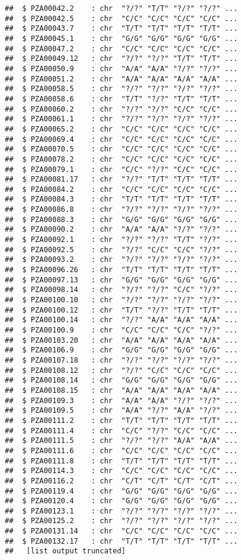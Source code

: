 \documentclass[
]{article}
\begin{document}
\begin{verbatim}
##  $ PZA00042.2    : chr  "?/?" "T/T" "?/?" "?/?" ...
##  $ PZA00042.5    : chr  "C/C" "C/C" "C/C" "C/C" ...
##  $ PZA00043.7    : chr  "T/T" "T/T" "T/T" "T/T" ...
##  $ PZA00045.1    : chr  "G/G" "G/G" "G/G" "G/G" ...
##  $ PZA00047.2    : chr  "C/C" "C/C" "C/C" "C/C" ...
##  $ PZA00049.12   : chr  "?/?" "?/?" "T/T" "T/T" ...
##  $ PZA00050.9    : chr  "A/A" "A/A" "?/?" "?/?" ...
##  $ PZA00051.2    : chr  "A/A" "A/A" "A/A" "A/A" ...
##  $ PZA00058.5    : chr  "?/?" "?/?" "?/?" "?/?" ...
##  $ PZA00058.6    : chr  "T/T" "?/?" "T/T" "T/T" ...
##  $ PZA00060.2    : chr  "?/?" "?/?" "C/C" "C/C" ...
##  $ PZA00061.1    : chr  "?/?" "?/?" "?/?" "?/?" ...
##  $ PZA00065.2    : chr  "C/C" "C/C" "C/C" "C/C" ...
##  $ PZA00069.4    : chr  "C/C" "C/C" "C/C" "C/C" ...
##  $ PZA00070.5    : chr  "C/C" "C/C" "C/C" "C/C" ...
##  $ PZA00078.2    : chr  "C/C" "C/C" "C/C" "C/C" ...
##  $ PZA00079.1    : chr  "C/C" "?/?" "C/C" "C/C" ...
##  $ PZA00081.17   : chr  "?/?" "T/T" "T/T" "T/T" ...
##  $ PZA00084.2    : chr  "C/C" "C/C" "C/C" "C/C" ...
##  $ PZA00084.3    : chr  "T/T" "T/T" "T/T" "T/T" ...
##  $ PZA00086.8    : chr  "?/?" "?/?" "?/?" "?/?" ...
##  $ PZA00088.3    : chr  "G/G" "G/G" "G/G" "G/G" ...
##  $ PZA00090.2    : chr  "A/A" "A/A" "?/?" "?/?" ...
##  $ PZA00092.1    : chr  "?/?" "?/?" "T/T" "?/?" ...
##  $ PZA00092.5    : chr  "?/?" "C/C" "C/C" "?/?" ...
##  $ PZA00093.2    : chr  "?/?" "?/?" "?/?" "?/?" ...
##  $ PZA00096.26   : chr  "T/T" "T/T" "T/T" "T/T" ...
##  $ PZA00097.13   : chr  "G/G" "G/G" "G/G" "G/G" ...
##  $ PZA00098.14   : chr  "?/?" "?/?" "C/C" "?/?" ...
##  $ PZA00100.10   : chr  "?/?" "?/?" "?/?" "?/?" ...
##  $ PZA00100.12   : chr  "T/T" "?/?" "T/T" "T/T" ...
##  $ PZA00100.14   : chr  "?/?" "A/A" "A/A" "A/A" ...
##  $ PZA00100.9    : chr  "C/C" "C/C" "C/C" "?/?" ...
##  $ PZA00103.20   : chr  "A/A" "A/A" "A/A" "A/A" ...
##  $ PZA00106.9    : chr  "G/G" "G/G" "G/G" "G/G" ...
##  $ PZA00107.18   : chr  "?/?" "?/?" "?/?" "?/?" ...
##  $ PZA00108.12   : chr  "?/?" "C/C" "C/C" "C/C" ...
##  $ PZA00108.14   : chr  "G/G" "G/G" "G/G" "G/G" ...
##  $ PZA00108.15   : chr  "A/A" "A/A" "A/A" "A/A" ...
##  $ PZA00109.3    : chr  "A/A" "A/A" "?/?" "?/?" ...
##  $ PZA00109.5    : chr  "A/A" "?/?" "A/A" "?/?" ...
##  $ PZA00111.2    : chr  "T/T" "T/T" "T/T" "T/T" ...
##  $ PZA00111.4    : chr  "C/C" "?/?" "C/C" "C/C" ...
##  $ PZA00111.5    : chr  "?/?" "?/?" "A/A" "A/A" ...
##  $ PZA00111.6    : chr  "C/C" "C/C" "C/C" "C/C" ...
##  $ PZA00111.8    : chr  "T/T" "T/T" "T/T" "T/T" ...
##  $ PZA00114.3    : chr  "C/C" "C/C" "C/C" "C/C" ...
##  $ PZA00116.2    : chr  "C/T" "C/T" "C/T" "C/T" ...
##  $ PZA00119.4    : chr  "G/G" "G/G" "G/G" "G/G" ...
##  $ PZA00120.4    : chr  "G/G" "G/G" "G/G" "G/G" ...
##  $ PZA00123.1    : chr  "?/?" "?/?" "?/?" "?/?" ...
##  $ PZA00125.2    : chr  "?/?" "?/?" "?/?" "?/?" ...
##  $ PZA00131.14   : chr  "C/C" "C/C" "C/C" "C/C" ...
##  $ PZA00132.17   : chr  "T/T" "T/T" "T/T" "T/T" ...
##   [list output truncated]
\end{verbatim}
\end{document}
